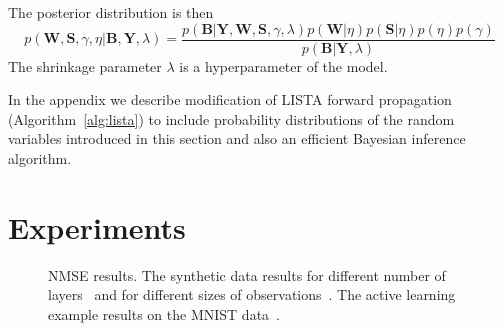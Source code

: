 \documentclass{article}
\begin{document}
  The posterior distribution is then
  \begin{equation}
  \label{eq:posterior}
  p(\mathbf{W}, \mathbf{S}, \gamma, \eta | \mathbf{B}, \mathbf{Y}, \lambda)
  = \frac{p(\mathbf{B} | \mathbf{Y}, \mathbf{W},  \mathbf{S}, \gamma, \lambda) p(\mathbf{W} | \eta )p(\mathbf{S} | \eta) p(\eta) p(\gamma)}{p(\mathbf{B} | \mathbf{Y}, \lambda)}
  \end{equation}
  The shrinkage parameter $\lambda$ is a hyperparameter of the model.
  
In the appendix we describe modification of LISTA forward propagation (Algorithm~\ref{alg:lista}) to include probability distributions of the random variables introduced in this section and also an efficient Bayesian inference algorithm.
  
  \section{Experiments}
  \label{sec:experiments}

   \begin{figure}[!t]
  \centering
  \hfil
  \hfil
  \caption{NMSE results. The synthetic data results for different number of layers~\protect{} and for different sizes of observations~\protect{}. The active learning example results on the MNIST data~\protect{}.}
  \label{fig:number_of_layers_synthetic}
  \end{figure}  
  
\end{document}
